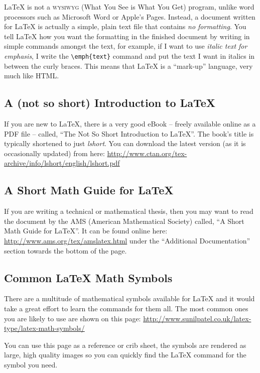 \LaTeX{} is not a \textsc{wysiwyg} (What You See is What You Get)
program, unlike word processors such as Microsoft Word or Apple's
Pages. Instead, a document written for \LaTeX{} is actually a simple,
plain text file that contains \emph{no formatting}. You tell \LaTeX{}
how you want the formatting in the finished document by writing in
simple commands amongst the text, for example, if I want to use
\emph{italic text for emphasis}, I write the \verb|\emph{text}| command
and put the text I want in italics in between the curly braces. This
means that \LaTeX{} is a \enquote{mark-up} language, very much like
HTML.

\subsection{A (not so short) Introduction to \LaTeX{}}

If you are new to \LaTeX{}, there is a very good eBook -- freely
available online as a PDF file -- called, \enquote{The Not So Short
  Introduction to \LaTeX{}}. The book's title is typically shortened to
just \emph{lshort}. You can download the latest version (as it is
occasionally updated) from here:
\url{http://www.ctan.org/tex-archive/info/lshort/english/lshort.pdf}

\subsection{A Short Math Guide for \LaTeX{}}

If you are writing a technical or mathematical thesis, then you may want
to read the document by the AMS (American Mathematical Society) called,
\enquote{A Short Math Guide for \LaTeX{}}. It can be found online here:
\url{http://www.ams.org/tex/amslatex.html} under the \enquote{Additional
  Documentation} section towards the bottom of the page.

\subsection{Common \LaTeX{} Math Symbols}
There are a multitude of mathematical symbols available for \LaTeX{} and
it would take a great effort to learn the commands for them all. The
most common ones you are likely to use are shown on this page:
\url{http://www.sunilpatel.co.uk/latex-type/latex-math-symbols/}

You can use this page as a reference or crib sheet, the symbols are
rendered as large, high quality images so you can quickly find the
\LaTeX{} command for the symbol you need.

